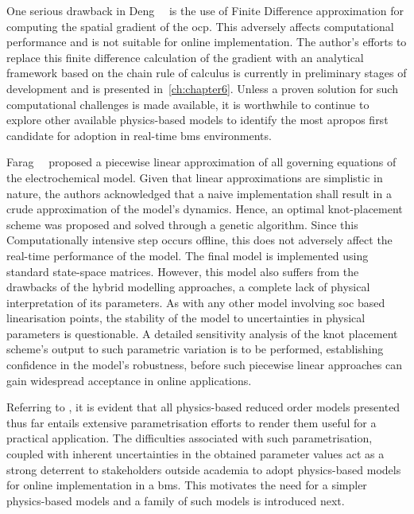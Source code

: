 One  serious  drawback in  Deng~\etal{}~\cite{Deng2018}  is  the use  of  Finite
Difference approximation  for computing the  spatial gradient of  the \gls{ocp}.
This  adversely  affects  computational  performance and  is  not  suitable  for
online implementation.  The author's efforts  to replace this  finite difference
calculation of  the gradient  with an  analytical framework  based on  the chain
rule  of calculus  is  currently in  preliminary stages  of  development and  is
presented in~\cref{ch:chapter6}. Unless a proven solution for such computational
challenges is  made available,  it is  worthwhile to  continue to  explore other
available physics-based models to identify  the most apropos first candidate for
adoption in real-time \gls{bms} environments.


Farag~\etal{}~\cite{Farag2017}  proposed  a  piecewise linear  approximation  of
all  governing  equations  of  the  electrochemical  model.  Given  that  linear
approximations are simplistic  in nature, the authors acknowledged  that a naive
implementation shall  result in a  crude approximation of the  model's dynamics.
Hence,  an optimal  knot-placement  scheme  was proposed  and  solved through  a
genetic  algorithm. Since  this Computationally  intensive step  occurs offline,
this does not adversely affect the real-time performance of the model. The final
model is  implemented using standard  state-space matrices. However,  this model
also suffers  from the  drawbacks of  the hybrid  modelling approaches,  \ie{} a
complete lack  of physical interpretation of  its parameters. As with  any other
model involving \gls{soc} based linearisation points, the stability of the model
to uncertainties in physical parameters  is questionable. A detailed sensitivity
analysis of the  knot placement scheme's output to such  parametric variation is
to  be performed,  establishing  confidence in  the  model's robustness,  before
such  piecewise  linear approaches  can  gain  widespread acceptance  in  online
applications.





Referring  to   ,  it   is  evident   that  all
physics-based  reduced  order  models   presented  thus  far  entails  extensive
parametrisation efforts   to render  them useful for a  practical application.
The  difficulties associated  with such  parametrisation, coupled  with inherent
uncertainties  in  the obtained  parameter  values  act  as a  strong  deterrent
to  stakeholders  outside academia  to  adopt  physics-based models  for  online
implementation  in  a   \gls{bms}.  This  motivates  the  need   for  a  simpler
physics-based models and a family of such models is introduced next.


